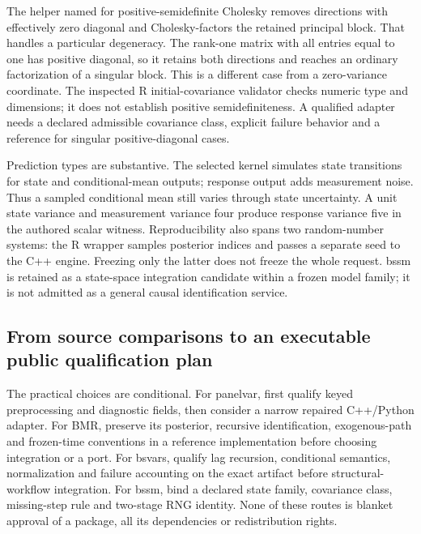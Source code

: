 The helper named for positive-semidefinite Cholesky removes directions with effectively zero diagonal and Cholesky-factors the retained principal block. That handles a particular degeneracy. The rank-one matrix with all entries equal to one has positive diagonal, so it retains both directions and reaches an ordinary factorization of a singular block. This is a different case from a zero-variance coordinate. The inspected R initial-covariance validator checks numeric type and dimensions; it does not establish positive semidefiniteness. A qualified adapter needs a declared admissible covariance class, explicit failure behavior and a reference for singular positive-diagonal cases.~\citep{exec25_cdyn_bssm,exec25_cdyn_choice}

Prediction types are substantive. The selected kernel simulates state transitions for state and conditional-mean outputs; response output adds measurement noise. Thus a sampled conditional mean still varies through state uncertainty. A unit state variance and measurement variance four produce response variance five in the authored scalar witness. Reproducibility also spans two random-number systems: the R wrapper samples posterior indices and passes a separate seed to the C++ engine. Freezing only the latter does not freeze the whole request. bssm is retained as a state-space integration candidate within a frozen model family; it is not admitted as a general causal identification service.~\citep{exec25_cdyn_bssm,exec25_cdyn_choice}

\subsection{From source comparisons to an executable public qualification plan}

The practical choices are conditional. For panelvar, first qualify keyed preprocessing and diagnostic fields, then consider a narrow repaired C++/Python adapter. For BMR, preserve its posterior, recursive identification, exogenous-path and frozen-time conventions in a reference implementation before choosing integration or a port. For bsvars, qualify lag recursion, conditional semantics, normalization and failure accounting on the exact artifact before structural-workflow integration. For bssm, bind a declared state family, covariance class, missing-step rule and two-stage RNG identity. None of these routes is blanket approval of a package, all its dependencies or redistribution rights.~\citep{exec25_cdyn_choice}

